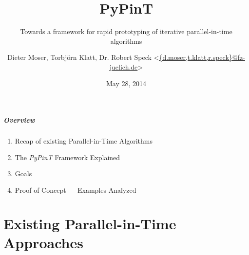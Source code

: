 \documentclass[%
  english,
  hyperref={pdfpagelabels=false},
  aspectratio=1610]{beamer}
\title{PyPinT}
\subtitle{Towards a framework for rapid prototyping of iterative parallel-in-time algorithms}
\author{Dieter Moser, Torbjörn Klatt, Dr. Robert Speck
  <\href{mailto:d.moser@fz-juelich.de}{\{d.moser,t.klatt,r.speck\}@fz-juelich.de}>%
}
\institute{3rd Workshop on Parallel-in-Time Integration Methods}
\date{May 28, 2014}
\begin{document}
\maketitle

\begin{frame}
  \frametitle{Overview}
  \begin{enumerate}
    \item Recap of existing Parallel-in-Time Algorithms
    \item The \emph{PyPinT} Framework Explained
    \item Goals
    \item Proof of Concept --- Examples Analyzed
  \end{enumerate}
\end{frame}


\part{Existing Parallel-in-Time Approaches}
\makepart
\end{document}
